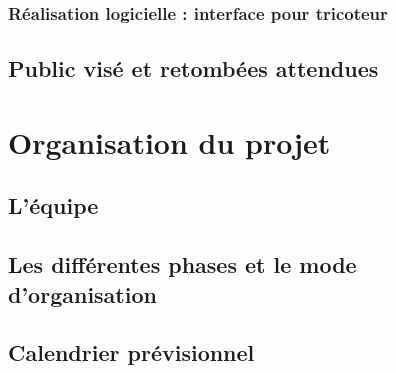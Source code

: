 \documentclass{article}
\begin{document}
\subsubsection{Réalisation logicielle : interface pour tricoteur}

\subsection{Public visé et retombées attendues}

\section{Organisation du projet}

\subsection{L'équipe}

\subsection{Les différentes phases et le mode d'organisation}

\subsection{Calendrier prévisionnel}
\end{document}
